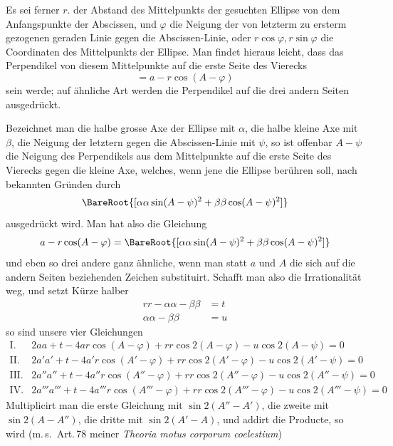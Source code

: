 \par
{}%
Es sei ferner \(r\). der Abstand des Mittelpunkts der gesuchten Ellipse von dem Anfangspunkte der Abscissen, und \(\varphi\) die Neigung der von letzterm zu ersterm gezogenen geraden Linie gegen die Abscissen-Linie, oder \(r\cos\varphi,r\sin\varphi\) die Coordinaten des Mittelpunkts der Ellipse. Man findet hieraus leicht, dass das Perpendikel von diesem Mittelpunkte auf die erste Seite des Vierecks
\[
=a-r\cos(A-\varphi)
\]
sein werde; auf ähnliche Art werden die Perpendikel auf die drei andern Seiten ausgedrückt.

Bezeichnet man die halbe grosse Axe der Ellipse mit \(\alpha\), die halbe kleine Axe mit \(\beta\), die Neigung der letztern gegen die Abscissen-Linie mit \(\psi\), so ist offenbar \(A-\psi\) die Neigung des Perpendikels aus dem Mittelpunkte auf die erste Seite des Vierecks gegen die kleine Axe, welches, wenn jene die Ellipse berühren soll, nach bekannten Gründen durch
\[
\BareRoot{[\alpha\alpha\sin(A-\psi)^2+\beta\beta\cos(A-\psi)^2]}
\]
ausgedrückt wird. Man hat also die Gleichung
\[
a-r\cos(A-\varphi)=\BareRoot{[\alpha\alpha\sin(A-\psi)^2+\beta\beta\cos(A-\psi)^2]}
\]
und eben so drei andere ganz ähnliche, wenn man statt \(a\) und \(A\) die sich auf die andern Seiten beziehenden Zeichen substituirt. Schafft man also die Irrationalität weg, und setzt Kürze halber
\[
\begin{aligned}
rr-\alpha\alpha-\beta\beta&=t\\
\alpha\alpha-\beta\beta&=u
\end{aligned}
\]
so sind unsere vier Gleichungen
\begingroup\fontsize{10}{12}\selectfont
\[
\begin{array}{rl}
\mathrm{I.}&2aa+t-4ar\cos(A-\varphi)+rr\cos2(A-\varphi)-u\cos2(A-\psi)=0\\
\mathrm{II.}&2a'a'+t-4a'r\cos(A'-\varphi)+rr\cos2(A'-\varphi)-u\cos2(A'-\psi)=0\\
\mathrm{III.}&2a''a''+t-4a''r\cos(A''-\varphi)+rr\cos2(A''-\varphi)-u\cos2(A''-\psi)=0\\
\mathrm{IV.}&2a'''a'''+t-4a'''r\cos(A'''-\varphi)+rr\cos2(A'''-\varphi)-u\cos2(A'''-\psi)=0
\end{array}
\]
\endgroup
Multiplicirt man die erste Gleichung mit \(\sin2(A''-A')\), die zweite mit \(\sin2(A-A'')\), die dritte mit \(\sin2(A'-A)\), und addirt die Producte, so wird (m.\,s.\ Art.\,78 meiner \textit{Theoria motus corporum coelestium})
